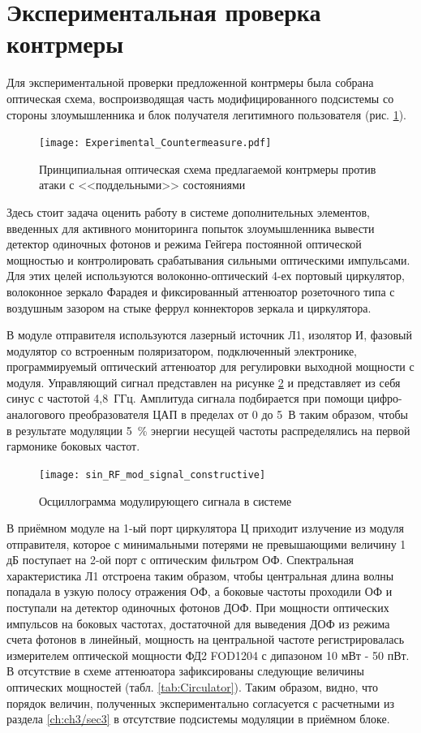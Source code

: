 \section{Экспериментальная проверка контрмеры} \label{ch:ch3/sec5}

Для экспериментальной проверки предложенной контрмеры была собрана оптическая схема, воспроизводящая часть модифицированного подсистемы со стороны злоумышленника и блок получателя легитимного пользователя (рис. \ref{fig:Experimental_countermeasure}). 


 \begin{figure}[ht]
  \centering
  \texttt{[image: Experimental\_Countermeasure.pdf]}
  \caption{Принципиальная оптическая схема предлагаемой контрмеры против атаки с <<поддельными>> состояниями}
  \label{fig:Experimental_countermeasure}
\end{figure}

Здесь стоит задача оценить работу в системе дополнительных элементов, введенных для активного мониторинга попыток злоумышленника вывести детектор одиночных фотонов и режима Гейгера постоянной оптической мощностью и контролировать срабатывания сильными оптическими импульсами. Для этих целей используются волоконно-оптический 4-ех портовый циркулятор, волоконное зеркало Фарадея и фиксированный аттенюатор розеточного типа с воздушным зазором на стыке феррул коннекторов зеркала и циркулятора. 

В модуле отправителя используются лазерный источник Л1, изолятор И, фазовый модулятор со встроенным поляризатором, подключенный электронике, программируемый оптический аттенюатор для регулировки выходной мощности с модуля. Управляющий сигнал представлен на рисунке \ref{fig:RF_sin_osc} и представляет из себя синус с частотой 4,8~ГГц. Амплитуда сигнала подбирается при помощи цифро-аналогового преобразователя ЦАП в пределах от 0 до 5~В таким образом, чтобы в результате модуляции 5~\% энергии несущей частоты распределялись на первой гармонике боковых частот.    


 \begin{figure}[ht]
  \centering
  \texttt{[image: sin\_RF\_mod\_signal\_constructive]}
  \caption{Осциллограмма модулирующего сигнала в системе}
  \label{fig:RF_sin_osc}
\end{figure}


В приёмном модуле на 1-ый порт циркулятора Ц приходит излучение из модуля отправителя, которое с минимальными потерями не превышающими величину 1 дБ поступает на 2-ой порт с оптическим фильтром ОФ. Спектральная характеристика Л1 отстроена таким образом, чтобы центральная длина волны попадала в узкую полосу отражения ОФ, а боковые частоты проходили ОФ и поступали на детектор одиночных фотонов ДОФ. При мощности оптических импульсов на боковых частотах, достаточной для выведения ДОФ из режима счета фотонов в линейный, мощность на центральной частоте регистрировалась измерителем оптической мощности ФД2 FOD1204 с дипазоном 10 мВт - 50 пВт. В отсутствие в схеме аттенюатора зафиксированы следующие величины оптических мощностей (табл. \ref{tab:Circulator}). Таким образом, видно, что порядок величин, полученных экспериментально согласуется с расчетными из раздела \ref{ch:ch3/sec3} в отсутствие подсистемы модуляции в приёмном блоке. 



